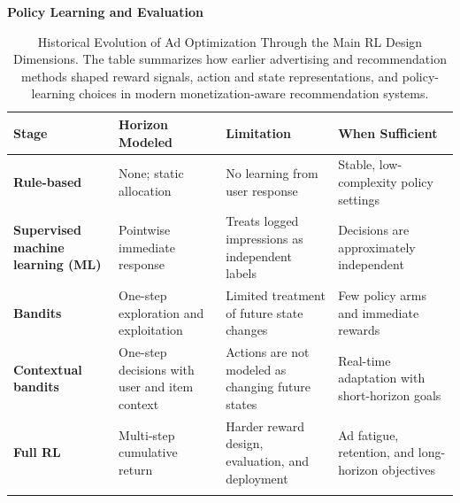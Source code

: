 \documentclass[manuscript,review,screen]{acmart}
\begin{document}
\begin{table}[ht]
\textbf{Policy Learning and Evaluation}\\[0.3em]
\begin{tabularx}{\textwidth}{>{\raggedright\arraybackslash}p{} >{\raggedright\arraybackslash}p{} >{\raggedright\arraybackslash}p{} >{\raggedright\arraybackslash}p{}}
\toprule
\textbf{Stage} & \textbf{Horizon Modeled} & \textbf{Limitation} & \textbf{When Sufficient} \\
\midrule
\textbf{Rule-based} & None; static allocation & No learning from user response & Stable, low-complexity policy settings \\
\textbf{Supervised machine learning (ML)} & Pointwise immediate response & Treats logged impressions as independent labels & Decisions are approximately independent \\
\textbf{Bandits} & One-step exploration and exploitation & Limited treatment of future state changes & Few policy arms and immediate rewards \\
\textbf{Contextual bandits} & One-step decisions with user and item context & Actions are not modeled as changing future states & Real-time adaptation with short-horizon goals \\
\textbf{Full RL} & Multi-step cumulative return & Harder reward design, evaluation, and deployment & Ad fatigue, retention, and long-horizon objectives \\
\midrule
\multicolumn{4}{>{\raggedright\arraybackslash}p{0.94\textwidth}}{\emph{Representative sources:} \cite{li2010contextual, bietti2021contextual, swaminathan2015counterfactual, zhao2021dear, gauci2018horizon}.} \\
\bottomrule
\end{tabularx}

\caption{Historical Evolution of Ad Optimization Through the Main RL Design Dimensions. The table summarizes how earlier advertising and recommendation methods shaped reward signals, action and state representations, and policy-learning choices in modern monetization-aware recommendation systems.}
\label{tab:evolution-tracks}
\end{table}
\end{document}
